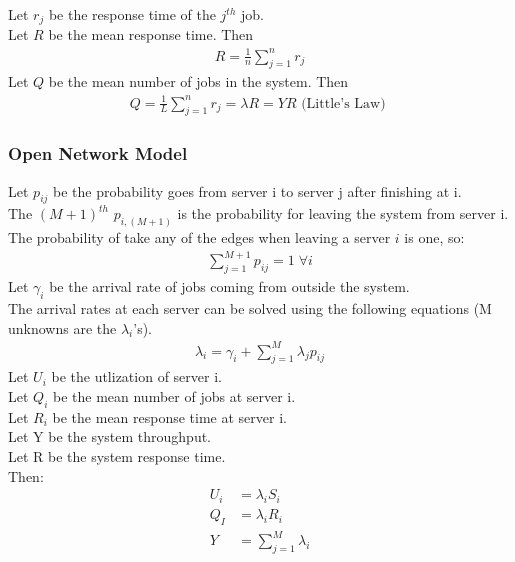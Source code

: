 Let $r_j$ be the response time of the $j^{th}$ job. \\
Let $R$ be the mean response time. Then
\begin{equation*} \begin{split}
	R = \frac{1}{n} \sum_{j=1}^n r_j
\end{split} \end{equation*}
Let $Q$ be the mean number of jobs in the system. Then
\begin{equation*} \begin{split}
	Q = \frac{1}{L} \sum_{j=1}^n r_j = \lambda R = Y R \mbox{ (Little's Law) }
\end{split} \end{equation*}

\subsubsection{Open Network Model}

Let $p_{ij}$ be the probability goes from server i to server j after finishing at i. \\
The $(M+1)^{th}$ $p_{i,(M+1)}$ is the probability for leaving the system from server i. \\
The probability of take any of the edges when leaving a server $i$ is one, so:
\begin{equation*} \begin{split}
	\sum_{j=1}^{M+1} p_{ij} = 1 \; \forall i
\end{split} \end{equation*}
Let $\gamma_i$ be the arrival rate of jobs coming from outside the system.\\
The arrival rates at each server can be solved using the following equations (M
unknowns are the $\lambda_i$'s).
\begin{equation*} \begin{split}
	\lambda_i = \gamma_i + \sum_{j=1}^M \lambda_j p_{ij}
\end{split} \end{equation*}
Let $U_i$ be the utlization of server i. \\
Let $Q_i$ be the mean number of jobs at server i. \\
Let $R_i$ be the mean response time at server i. \\
Let Y be the system throughput. \\
Let R be the system response time. \\
Then:
\begin{align*} 
	U_i &= \lambda_i S_i \\
	Q_I &= \lambda_i R_i \\
	Y   &= \sum_{j=1}^M \lambda_i 
\end{align*} 



